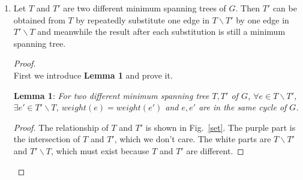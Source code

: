 \documentclass[12pt,a4paper]{article}
\theoremstyle{definition}
\begin{document}
\begin{enumerate}
\begin{enumerate}
\begin{proof}
        Finally, we prove that there is a minimum spanning tree that does not include $e$.
        
        ~\\
        We prove the second proposition \textbf{by contradiction}.
        
        \textbf{Assume} the minimum spanning tree $T$ of the graph $G$ includes the edge $e$, which is an unique maximum-weight edge on some cycle of connected graph $G=(V,E)$.
        
        Since $T$ is a minimum spanning tree, it will have cycles if we add one more edge of the graph $G$.
        
        Since $G$ already has at least one cycle, which we have assumed as the basic setting, we know that: \textbf{for this cycle in the graph, it has at least one edge not included in $\mathbf{T}$.} Otherwise, $T$ will have cycles. Let's denote this edge not included as $e_{cycle}$(in the same cycle with $e$).
        
        By the assumption, $e$ is the unique maximum-weight edge, so $e_{cycle}$ has a smaller weight.
        
        Therefore, \textbf{$\mathbf{T}$ is not a minimum spanning tree}. Because $T$ can remove $e$ and select $e_{cycle}$, which both ensures the connectivity and diminishes the sum of the weights. 
        
        However, this contradicts the assumption, which means the assumption is wrong. So there is no minimum spanning tree including $e$.
        
        By contradiction, we finish proving the second  proposition.
        \end{proof}
		\item Let $T$ and $T'$ are two different minimum spanning trees of $G$. Then $T'$ can be obtained from $T$ by repeatedly substitute one edge in $T\backslash T'$ by one edge in $T'\backslash T$ and meanwhile the result after each substitution is still a minimum spanning tree.
		\begin{proof}
		~\\
		First we introduce \textbf{Lemma 1} and prove it.
		
		\textbf{Lemma 1}: \textit{For two different minimum spanning tree $T,T'$ of $G$, $\forall e \in T\backslash T'$, $\exists e' \in T'\backslash T $, $weight(e)=weight(e')$ and $e,e'$ are in the same cycle of $G$.}
		\begin{proof}
		The relationship of $T$ and $T'$ is shown in Fig.~\ref{set}. The purple part is the intersection of $T$ and $T'$, which we don't care. The white parts are $T\backslash T'$ and $T'\backslash T$, which must exist because $T$ and $T'$ are different.
		

\end{proof}
\end{proof}
\end{enumerate}
\end{enumerate}
\end{document}
